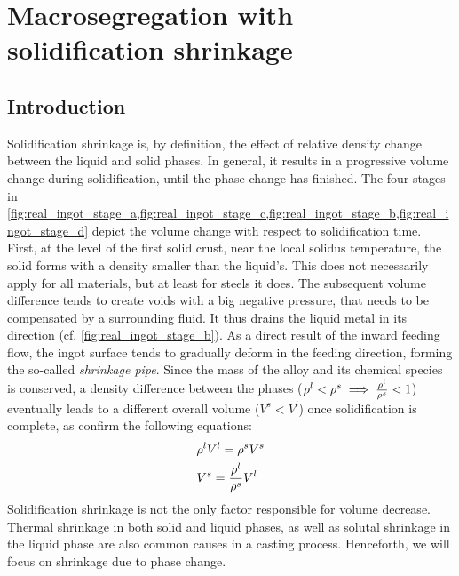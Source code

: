 \chapter{Macrosegregation with solidification shrinkage}
\begin{nolinkcolors} 
\minitoc
\end{nolinkcolors}
\newpage

\section{Introduction}

Solidification shrinkage is, by definition, the effect of relative density change between the liquid and solid phases.
In general, it results in a progressive volume change during solidification, until the phase change has finished. 
The four stages in \cref{fig:real_ingot_stage_a,fig:real_ingot_stage_c,fig:real_ingot_stage_b,fig:real_ingot_stage_d} depict the volume change with 
respect to solidification time.
First, at the level of the first solid crust, near the local solidus temperature, the solid forms with a density smaller than 
the liquid's. This does not necessarily apply for all materials, but at least for steels it does. The subsequent volume difference 
tends to create voids with a big negative pressure, that needs to be compensated by a surrounding fluid. It thus drains 
the liquid metal in its direction (cf. \autoref{fig:real_ingot_stage_b}). As a direct result of the inward feeding flow, the ingot surface
tends to gradually deform in the feeding direction, forming the so-called \emph{shrinkage pipe}. Since the mass of the alloy and its 
chemical species is conserved, a density difference between the phases ($\rho^l < \rho^s \implies \frac{\rho^l}{\rho^s}<1$) eventually leads 
to a different overall volume ($V^s<V^l$) once solidification is complete, as confirm the following equations:
\begin{subequations}
\begin{align}
& \rho^l V^l = \rho^s V^s  \\ 
& V^s = \frac{\rho^l}{\rho^s} V^l
\end{align}
\end{subequations}
Solidification shrinkage is not the only factor responsible for volume decrease. Thermal shrinkage in both solid and liquid phases, as well 
as solutal shrinkage in the liquid phase are also common causes in a casting process. Henceforth, we will focus on shrinkage due to phase change.
